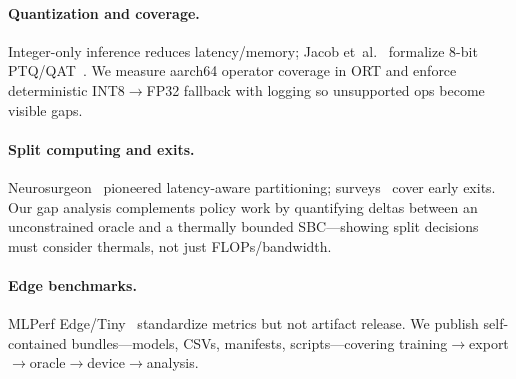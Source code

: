 \documentclass{article}
\begin{document}
\paragraph{Quantization and coverage.}
Integer-only inference reduces latency/memory; Jacob et~al.~\cite{jacob2018quantization} formalize 8-bit PTQ/QAT~\cite{tflite_ptq,tflite_qat}. We measure aarch64 operator coverage in ORT and enforce deterministic INT8$\!\to$FP32 fallback with logging so unsupported ops become visible gaps.

\paragraph{Split computing and exits.}
Neurosurgeon~\cite{kang2017neurosurgeon} pioneered latency-aware partitioning; surveys~\cite{matsubara2022split} cover early exits. Our gap analysis complements policy work by quantifying deltas between an unconstrained oracle and a thermally bounded SBC—showing split decisions must consider thermals, not just FLOPs/bandwidth.

\paragraph{Edge benchmarks.}
MLPerf Edge/Tiny~\cite{mlperf_edge,mlperf_tiny_neurips} standardize metrics but not artifact release. We publish self-contained bundles—models, CSVs, manifests, scripts—covering training$\rightarrow$export$\rightarrow$oracle$\rightarrow$device$\rightarrow$analysis.

\begin{table}[h]
  \centering
  \small
  \caption{Selected edge-inference and deployment systems.}
  \label{tab:related-systems}
\end{table}
\end{document}
